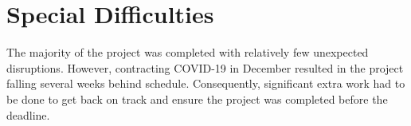 \pagebreak


\section*{Special Difficulties}
\indent \indent
The majority of the project was completed with relatively few unexpected disruptions. However, contracting COVID-19 in December resulted in the project falling several weeks behind schedule. Consequently, significant extra work had to be done to get back on track and ensure the project was completed before the deadline. 

